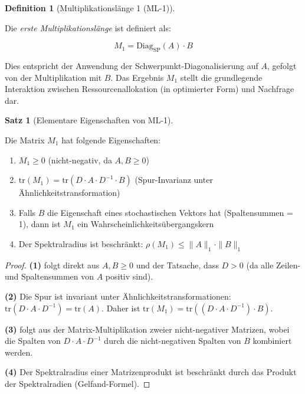 \documentclass[a4paper,12pt]{article}
\theoremstyle{definition}
\newtheorem{definition}{Definition}
\newtheorem{satz}{Satz}
\begin{document}
\begin{definition}[Multiplikationslänge 1 (ML-1)]
\label{def:ml1}

Die \emph{erste Multiplikationslänge} ist definiert als:

\begin{equation}
M_1 = \text{Diag}_{\text{SP}}(A) \cdot B
\end{equation}

Dies entspricht der Anwendung der Schwerpunkt-Diagonalisierung auf $A$, gefolgt von der Multiplikation mit $B$. Das Ergebnis $M_1$ stellt die grundlegende Interaktion zwischen Ressourcenallokation (in optimierter Form) und Nachfrage dar.

\end{definition}

\begin{satz}[Elementare Eigenschaften von ML-1]
\label{satz:ml1_prop}

Die Matrix $M_1$ hat folgende Eigenschaften:

\begin{enumerate}
\item $M_1 \geq 0$ (nicht-negativ, da $A, B \geq 0$)
\item $\text{tr}(M_1) = \text{tr}(D \cdot A \cdot D^{-1} \cdot B)$ (Spur-Invarianz unter Ähnlichkeitstransformation)
\item Falls $B$ die Eigenschaft eines stochastischen Vektors hat (Spaltensummen = 1), dann ist $M_1$ ein Wahrscheinlichkeitsübergangskern
\item Der Spektralradius ist beschränkt: $\rho(M_1) \leq \|A\|_1 \cdot \|B\|_1$
\end{enumerate}

\end{satz}

\begin{proof}

\textbf{(1)} folgt direkt aus $A, B \geq 0$ und der Tatsache, dass $D > 0$ (da alle Zeilen- und Spaltensummen von $A$ positiv sind).

\textbf{(2)} Die Spur ist invariant unter Ähnlichkeitstransformationen: $\text{tr}(D \cdot A \cdot D^{-1}) = \text{tr}(A)$. Daher ist $\text{tr}(M_1) = \text{tr}((D \cdot A \cdot D^{-1}) \cdot B)$.

\textbf{(3)} folgt aus der Matrix-Multiplikation zweier nicht-negativer Matrizen, wobei die Spalten von $D \cdot A \cdot D^{-1}$ durch die nicht-negativen Spalten von $B$ kombiniert werden.

\textbf{(4)} Der Spektralradius einer Matrizenprodukt ist beschränkt durch das Produkt der Spektralradien (Gelfand-Formel).

\end{proof}
\end{document}
